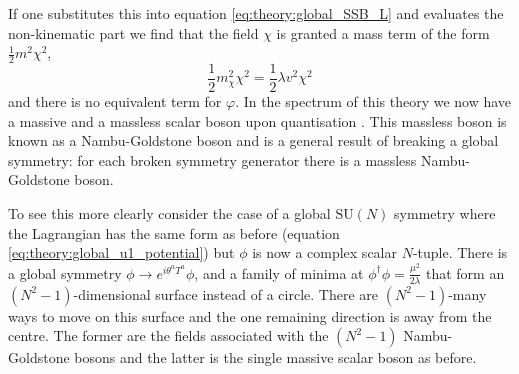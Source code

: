 If one substitutes this into equation \ref{eq:theory:global_SSB_L} and evaluates the non-kinematic part we find that the field $\chi$ is granted a mass term of the form $\frac{1}{2}m^{2}\chi^{2}$,
\begin{equation}
    \frac{1}{2}m_{\chi}^{2}\chi^{2} = \frac{1}{2}{\lambda}v^{2}\chi^{2}
\end{equation}
and there is no equivalent term for $\varphi$. In the spectrum of this theory we now have a massive and a massless scalar boson upon quantisation \cite{Nambu,Goldstone}. This massless boson is known as a Nambu-Goldstone boson and is a general result of breaking a global symmetry: for each broken symmetry generator there is a massless Nambu-Goldstone boson. 

To see this more clearly consider the case of a global $\mathrm{SU}(N)$ symmetry where the Lagrangian has the same form as before (equation \ref{eq:theory:global_u1_potential}) but $\phi$ is now a complex scalar $N$-tuple. 
There is a global symmetry $\phi\rightarrow{e^{i\theta^{a}T^{a}}}\phi$, and a family of minima at $\phi^{\dag}\phi = \frac{\mu^{2}}{2\lambda}$ that form an $(N^{2}-1)$-dimensional surface instead of a circle. There are $(N^{2}-1)$-many ways to move on this surface and the one remaining direction is away from the centre. The former are the fields associated with the $(N^{2}-1)$ Nambu-Goldstone bosons and the latter is the single massive scalar boson as before. 


